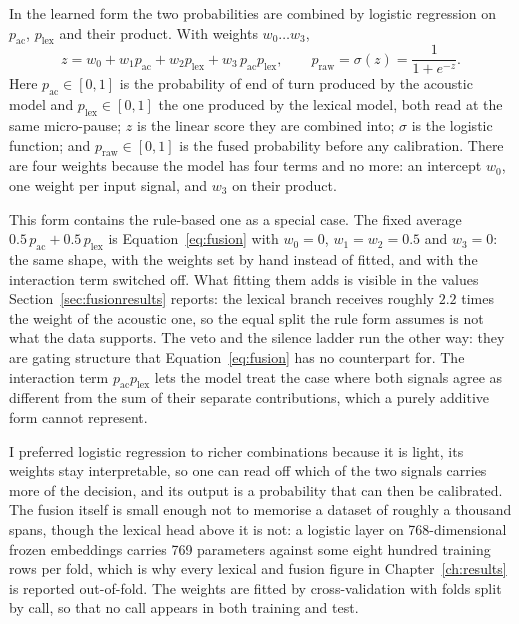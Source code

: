 In the learned form the two probabilities are combined by logistic regression on
$p_{\mathrm{ac}}$, $p_{\mathrm{lex}}$ and their product. With weights $w_0 \dots w_3$,
\begin{equation}
z = w_0 + w_1 p_{\mathrm{ac}} + w_2 p_{\mathrm{lex}} + w_3\, p_{\mathrm{ac}} p_{\mathrm{lex}},
\qquad
p_{\mathrm{raw}} = \sigma(z) = \frac{1}{1 + e^{-z}} .
\label{eq:fusion}
\end{equation}
Here $p_{\mathrm{ac}} \in [0,1]$ is the probability of end of turn produced by the acoustic
model and $p_{\mathrm{lex}} \in [0,1]$ the one produced by the lexical model, both read at
the same micro-pause; $z$ is the linear score they are combined into; $\sigma$ is the
logistic function; and $p_{\mathrm{raw}} \in [0,1]$ is the fused probability before any
calibration. There are four weights because the model has four terms and no more: an
intercept $w_0$, one weight per input signal, and $w_3$ on their product.

This form contains the rule-based one as a special case. The fixed average
$0.5\,p_{\mathrm{ac}} + 0.5\,p_{\mathrm{lex}}$ is Equation~\ref{eq:fusion} with
$w_0 = 0$, $w_1 = w_2 = 0.5$ and $w_3 = 0$: the same shape, with the weights set by hand
instead of fitted, and with the interaction term switched off. What fitting them adds is
visible in the values Section~\ref{sec:fusionresults} reports: the lexical branch receives
roughly $2.2$ times the weight of the acoustic one, so the equal split the rule form
assumes is not what the data supports. The veto and the silence ladder run the other way:
they are gating structure that Equation~\ref{eq:fusion} has no counterpart for. The interaction
term $p_{\mathrm{ac}} p_{\mathrm{lex}}$ lets the model treat the case where both signals
agree as different from the sum of their separate contributions, which a purely additive
form cannot represent. 

I preferred logistic regression to richer combinations because it is light, its weights stay interpretable, so one can read off which of the
two signals carries more of the decision, and its output is a probability that can then
be calibrated. The fusion itself is small enough not to memorise a dataset of roughly a thousand spans,
though the lexical head above it is not: a logistic layer on 768-dimensional frozen
embeddings carries 769 parameters against some eight hundred training rows per fold, which
is why every lexical and fusion figure in Chapter~\ref{ch:results} is reported
out-of-fold. The weights are fitted by cross-validation with folds split by
call, so that no call appears in both training and test.

